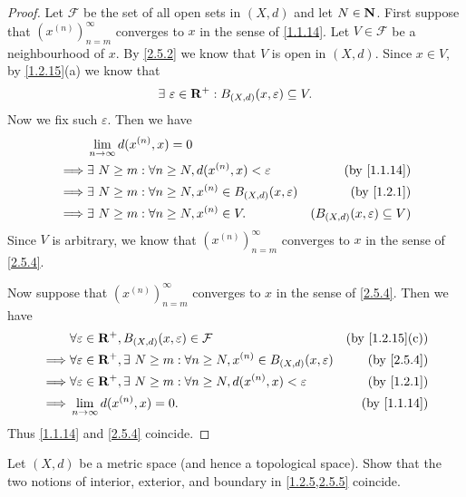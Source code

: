 \begin{proof}
  Let \(\mathcal{F}\) be the set of all open sets in \((X, d)\) and let \(N \in \mathbf{N}\).
  First suppose that \((x^{(n)})_{n = m}^\infty\) converges to \(x\) in the sense of \cref{1.1.14}.
  Let \(V \in \mathcal{F}\) be a neighbourhood of \(x\).
  By \cref{2.5.2} we know that \(V\) is open in \((X, d)\).
  Since \(x \in V\), by \cref{1.2.15}(a) we know that
  \[
    \exists\ \varepsilon \in \mathbf{R}^+ : B_{(X, d)}(x, \varepsilon) \subseteq V.
  \]
  Now we fix such \(\varepsilon\).
  Then we have
  \begin{align*}
             & \lim_{n \to \infty} d(x^{(n)}, x) = 0                                                                                   \\
    \implies & \exists\ N \geq m : \forall n \geq N, d(x^{(n)}, x) < \varepsilon            & \text{(by \cref{1.1.14})}                \\
    \implies & \exists\ N \geq m : \forall n \geq N, x^{(n)} \in B_{(X, d)}(x, \varepsilon) & \text{(by \cref{1.2.1})}                 \\
    \implies & \exists\ N \geq m : \forall n \geq N, x^{(n)} \in V.                         & (B_{(X, d)}(x, \varepsilon) \subseteq V)
  \end{align*}
  Since \(V\) is arbitrary, we know that \((x^{(n)})_{n = m}^\infty\) converges to \(x\) in the sense of \cref{2.5.4}.

  Now suppose that \((x^{(n)})_{n = m}^\infty\) converges to \(x\) in the sense of \cref{2.5.4}.
  Then we have
  \begin{align*}
             & \forall \varepsilon \in \R^+, B_{(X, d)}(x, \varepsilon) \in \mathcal{F}                                   & \text{(by \cref{1.2.15}(c))} \\
    \implies & \forall \varepsilon \in \R^+, \exists\ N \geq m : \forall n \geq N, x^{(n)} \in B_{(X, d)}(x, \varepsilon) & \text{(by \cref{2.5.4})}     \\
    \implies & \forall \varepsilon \in \R^+, \exists\ N \geq m : \forall n \geq N, d(x^{(n)}, x) < \varepsilon            & \text{(by \cref{1.2.1})}     \\
    \implies & \lim_{n \to \infty} d(x^{(n)}, x) = 0.                                                                     & \text{(by \cref{1.1.14})}
  \end{align*}
  Thus \cref{1.1.14} and \cref{2.5.4} coincide.
\end{proof}

\begin{exercise}\label{ex 2.5.3}
  Let \((X, d)\) be a metric space (and hence a topological space).
  Show that the two notions of interior, exterior, and boundary in \cref{1.2.5,2.5.5} coincide.
\end{exercise}

